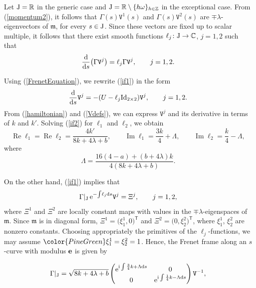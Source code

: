 \documentclass[10pt,a4paper]{amsart}
\newcommand\kk{k} %
\def\ri{\mathrm{i}}
\def\R{\mathbb R}
\def\Z{\mathbb Z}
\newcommand\be{{\bf e}}
\newcommand\tV{\mathtt{V}}
\renewcommand\Re{\operatorname{Re}}
\renewcommand\Im{\operatorname{Im}}
\newcommand\tomedit[1]{{\color{PineGreen}#1}}
\numberwithin{equation}{section}
\begin{document}
Let ${\rm J}=\R$ in the generic case and ${\rm J}=\R\setminus \{h\omega\}_{h\in \Z}$ in the exceptional case. From (\ref{momentum2}), it follows that $\Gamma(s) {\mathtt V}^1(s)$ and $\Gamma(s) {\mathtt V}^2(s)$ are $\mp \lambda$-eigenvectors of ${\mathfrak m}$, for every $s\in {\rm J}$.
Since these vectors are fixed up to scalar multiple,
it follows that there exist smooth functions
$\ell_j\colon {\rm J}\to {\mathbb C}$, $j=1,2$ such that
\begin{equation}\label{if1}\frac{{\rm d}}{{\rm d}s}\bigl(\Gamma {\mathtt V}^j\bigr) =\ell_j \Gamma {\mathtt V}^j,\qquad j=1,2.
\end{equation}

Using (\ref{FrenetEquation}), we rewrite ({\ref{if1}) in the form
\begin{equation}\label{if2}
\frac{{\rm d}}{{\rm d}s}\tV^j
=-(U-\ell_j{\rm Id}_{2\times 2}){\mathtt V}^j,\qquad j = 1,2.
\end{equation}
From (\ref{hamiltonian}) and (\ref{Vdefs}), we can express ${\mathtt V}^j$ and its derivative in terms of $\kk$ and $\kk'$. Solving (\ref{if2}}) for $\ell_{1}$ and $\ell_{2}$, we obtain
\[
\Re \ell_1=\Re \ell_2=\frac{4\kk'}{8\kk+4\lambda+b}, \qquad
\Im \ell_1=\frac{3\kk}{4}+\Lambda,\qquad
\Im \ell_2=\frac{\kk}{4}-\Lambda,
\]
where
\begin{equation}\label{Lambda}
\Lambda = \frac{16(4-a)+(b+4\lambda)\kk}{4(8\kk+4\lambda+b)}.
\end{equation}

On the other hand, (\ref{if1}) implies that
\begin{equation*}%
\Gamma|_{{\rm J}}\, {\rm e}^{-{\int \! \ell_j {\rm d}s}} {\mathtt V}^j= \Xi^j,\qquad j=1,2,
\end{equation*}
where $\Xi^1$ and $\Xi^2$ are locally constant maps with values in the $\mp\lambda$-eigenspaces of ${\mathfrak m}$.
Since ${\mathfrak m}$ is in diagonal form, $\Xi^1=\bigl(\xi_1^1,0\bigr)^{\mathsf{T}}$ and $\Xi^2=\bigl(0,\xi_2^2\bigr)^{\mathsf{T}}$, where $\xi_1^1$, $\xi_2^2$ are nonzero constants. Choosing appropriately the primitives of the $\ell_j$-functions, we may assume $\tomedit{\xi^1_1}=\xi^2_2=1$. Hence, the Frenet frame along an $s$-curve with modulus $\be$ is given by

\begin{equation}\label{quadrature}
\Gamma|_{{\rm J}}=\sqrt{8\kk+4\lambda+b}
 \begin{pmatrix} {\rm e}^{\ri \int\frac{3}{4}\kk +\Lambda {\rm d}s} & 0 \\ 0 & {\rm e}^{\ri \int \frac{1}{4}\kk -\Lambda {\rm d}s}\end{pmatrix} {\mathtt V}^{-1},
\end{equation}
\end{document}
